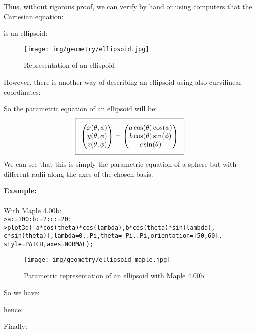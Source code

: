 {	Thus, without rigorous proof, we can verify by hand or using computers that the Cartesian equation:
	
	is an ellipsoid:
	\begin{figure}[H]
		\centering
		\texttt{[image: img/geometry/ellipsoid.jpg]}
		\caption{Representation of an ellispoid}
	\end{figure}
	However, there is another way of describing an ellipsoid using also curvilinear coordinates:
	
	So the parametric equation of an ellipsoid will be:
	\begin{equation}
	  \addtolength{\fboxsep}{5pt}
	   \boxed{
	   \begin{gathered}
	   		\begin{pmatrix}
	   		x(\theta,\phi)\\y(\theta,\phi)\\z(\theta,\phi)
	   		\end{pmatrix}=
	   		\begin{pmatrix}
	   		a\cos(\theta)\cos(\phi)\\b\cos(\theta)\sin(\phi)\\c\sin(\theta)
	   		\end{pmatrix}
	   \end{gathered}
	   }
	\end{equation}
	We can see that this is simply the parametric equation of a sphere but with different radii along the axes of the chosen basis.
	\begin{tcolorbox}[colframe=black,colback=white,sharp corners]
	\textbf{{\Large {}}Example:}\\\\
	With Maple 4.00b:\\

	\texttt{>a:=100:b:=2:c:=20:\\
>plot3d([a*cos(theta)*cos(lambda),b*cos(theta)*sin(lambda),\\
c*sin(theta)],lambda=0..Pi,theta=-Pi..Pi,orientation=[50,60],\\
style=PATCH,axes=NORMAL);
	}
	\begin{figure}[H]
		\centering
		\texttt{[image: img/geometry/ellipsoid\_maple.jpg]}
		\caption{Parametric representation of an ellipsoid with Maple 4.00b}
	\end{figure}
	\end{tcolorbox}
	So we have:
	
	hence:
	
	Finally:
	
}
